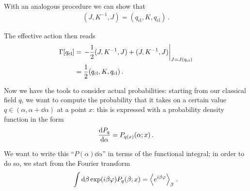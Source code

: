 \documentclass[main.tex]{subfiles}
\begin{document}
With an analogous procedure we can show that
%
\begin{align}
(J, K^{-1}, J) = (q _{\text{cl}}, K, q _{\text{cl}})
\,.
\end{align}

The effective action then reads
%
\begin{align}
\Gamma [q _{\text{cl}}] &= \eval{- \frac{1}{2} (J, K^{-1}, J) + (J, K^{-1}, J)}_{J = J(q _{\text{cl}})} \\
&= \frac{1}{2} (q _{\text{cl}}, K, q _{\text{cl}})
\,.
\end{align}

Now we have the tools to consider actual probabilities: starting from our classical field \(q\), we want to compute the probability that it takes on a certain value \(q \in (\alpha , \alpha + \dd{\alpha })\) at a point \(x\): this is expressed with a probability density function in the form 
%
\begin{align}
\dv{P_q}{\alpha } =P_{q(x)} (\alpha; x)
\,.
\end{align}

We want to write this ``\(P(\alpha ) \dd{\alpha }\)'' in terms of the functional integral; in order to do so, we start from the Fourier transform 
%
\begin{align}
\int \dd{\beta } \exp(i \beta \varphi ) P_q (\beta ; x) = \expval{e^{i \beta \varphi }}_{\beta }
\,.
\end{align}
\end{document}
